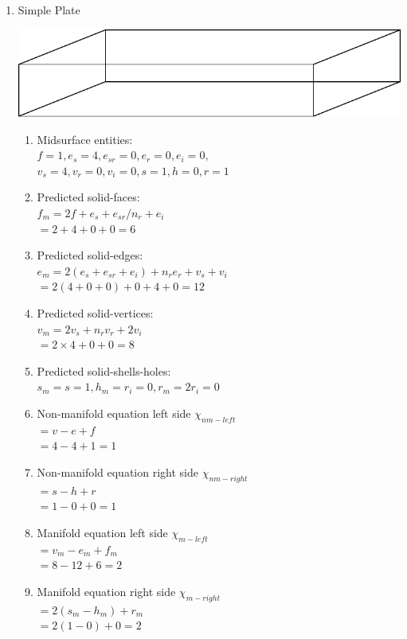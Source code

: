 \begin{enumerate}
[noitemsep,topsep=2pt,parsep=2pt,partopsep=2pt,leftmargin=*]
\item Simple Plate %

\begin{center}
\includegraphics[width=0.35\linewidth]{../Common/images/SimplePlate.pdf} 
\end{center}

\begin{enumerate}
\item Midsurface entities: \\$f = 1, e_s = 4, e_{sr} = 0, e_r = 0, e_i=0,$\\$v_s = 4,v_r =0, v_i= 0, s=1,h=0,r=1$
\item Predicted solid-faces: \\$f_m = 2f+e_s+e_{sr}/n_{r} +e_i $\\$= 2+4+0+0 = 6$
\item Predicted solid-edges: \\ $e_m = 2(e_s+e_{sr}+e_i )+n_{r} e_{r}+v_s+v_i $\\$= 2(4+0+0)+0+4+0 = 12$
\item Predicted solid-vertices: \\$v_m = 2v_s+n_{r} v_r+2v_i$\\$=2\times4 + 0 + 0=8$
\item Predicted solid-shells-holes: \\$s_m =s = 1, h_m = r_i  = 0, r_m = 2r_i = 0$
\item Non-manifold equation left side  $\chi_{nm-left} $\\$= v-e+f $\\$= 4-4+1 = 1$
\item Non-manifold equation right side  $\chi_{nm-right}$\\$=s-h+r$\\$=1-0+0 = 1$
\item Manifold equation left side  $\chi_{m-left} $\\$= v_m-e_m+f_m $\\$=8-12+6= 2$
\item Manifold equation right side  $\chi_{m-right}$\\$=2(s_m-h_m )+r_m$\\$= 2(1-0)+0 = 2$

\end{enumerate}
\end{enumerate}
